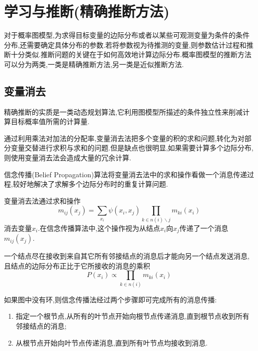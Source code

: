 \section{学习与推断(精确推断方法)}

对于概率图模型,为求得目标变量的边际分布或者以某些可观测变量为条件的条件分布,还需要确定具体分布的参数.若将参数视为待推测的变量,则参数估计过程和推断十分类似.推断问题的关键在于如何高效地计算边际分布.概率图模型的推断方法可以分为两类,一类是精确推断方法,另一类是近似推断方法.

\subsection{变量消去}

精确推断的实质是一类动态规划算法,它利用图模型所描述的条件独立性来削减计算目标概率值所需的计算量.

通过利用乘法对加法的分配率,变量消去法把多个变量的积的求和问题,转化为对部分变量交替进行求积与求和的问题.但是缺点也很明显,如果需要计算多个边际分布,则使用变量消去法会造成大量的冗余计算.


信念传播(Belief Propagation)算法将变量消去法中的求和操作看做一个消息传递过程,较好地解决了求解多个边际分布时的重复计算问题.

变量消去法通过求和操作
\begin{equation}
m_{ij}(x_j)=\sum_{x_i}\psi(x_i,x_j)\prod_{k\in n(i)\backslash j}m_{ki}(x_i)
\end{equation}
消去变量$x_i$.在信念传播算法中,这个操作视为从结点$x_i$向$x_j$传递了一个消息$m_{ij}(x_j)$.

一个结点尽在接收到来自其它所有邻接结点的消息后才能向另一个结点发送消息,且结点的边际分布正比于它所接收的消息的乘积
\begin{equation}
P(x_i)\propto\prod_{k\in n(i)}m_{ki}(x_i)
\end{equation}

如果图中没有环,则信念传播法经过两个步骤即可完成所有的消息传播:
\begin{enumerate}
\item 指定一个根节点,从所有的叶节点开始向根节点传递消息,直到根节点收到所有邻接结点的消息;
\item 从根节点开始向叶节点传递消息,直到所有叶节点均接收到消息.
\end{enumerate}

